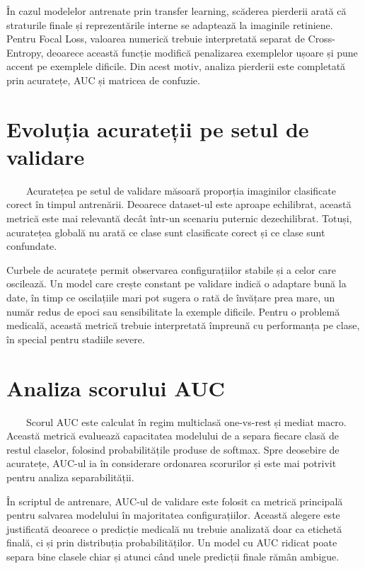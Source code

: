 \documentclass[12pt, a4paper, oneside, romanian]{teza-upb}
\begin{document}
În cazul modelelor antrenate prin transfer learning, scăderea pierderii arată că straturile finale și reprezentările interne se adaptează la imaginile retiniene. Pentru Focal Loss, valoarea numerică trebuie interpretată separat de Cross-Entropy, deoarece această funcție modifică penalizarea exemplelor ușoare și pune accent pe exemplele dificile. Din acest motiv, analiza pierderii este completată prin acuratețe, AUC și matricea de confuzie.

\section{Evoluția acurateții pe setul de validare}

\ \ \ \ Acuratețea pe setul de validare măsoară proporția imaginilor clasificate corect în timpul antrenării. Deoarece dataset-ul este aproape echilibrat, această metrică este mai relevantă decât într-un scenariu puternic dezechilibrat. Totuși, acuratețea globală nu arată ce clase sunt clasificate corect și ce clase sunt confundate.
\bigskip

Curbele de acuratețe permit observarea configurațiilor stabile și a celor care oscilează. Un model care crește constant pe validare indică o adaptare bună la date, în timp ce oscilațiile mari pot sugera o rată de învățare prea mare, un număr redus de epoci sau sensibilitate la exemple dificile. Pentru o problemă medicală, această metrică trebuie interpretată împreună cu performanța pe clase, în special pentru stadiile severe.

\section{Analiza scorului AUC}

\ \ \ \ Scorul AUC este calculat în regim multiclasă one-vs-rest și mediat macro. Această metrică evaluează capacitatea modelului de a separa fiecare clasă de restul claselor, folosind probabilitățile produse de softmax. Spre deosebire de acuratețe, AUC-ul ia în considerare ordonarea scorurilor și este mai potrivit pentru analiza separabilității.
\bigskip

În scriptul de antrenare, AUC-ul de validare este folosit ca metrică principală pentru salvarea modelului în majoritatea configurațiilor. Această alegere este justificată deoarece o predicție medicală nu trebuie analizată doar ca etichetă finală, ci și prin distribuția probabilităților. Un model cu AUC ridicat poate separa bine clasele chiar și atunci când unele predicții finale rămân ambigue.
\end{document}
